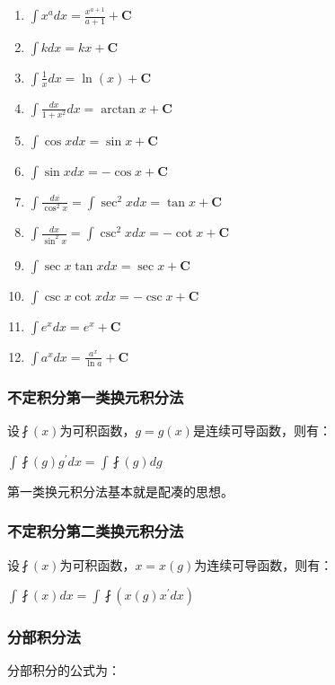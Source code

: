 \documentclass[UTF8]{ctexbook}
\newcommand{\derivative}{^\prime}
\newcommand{\defFunction}[1]{\fint(#1)}
\newcommand{\mathConstant}{\mathbf{C}}
\begin{document}
{{{{    \begin{enumerate}
      \item $\int x^adx = \frac{x^{a+1}}{a+1} + \mathConstant$
      \item $\int kdx = kx + \mathConstant$
      \item $\int \frac{1}{x}dx = \ln(x) + \mathConstant$
      \item $\int \frac{dx}{1+x^2}dx = \arctan x + \mathConstant$
      \item $\int \cos xdx = \sin x + \mathConstant$
      \item $\int \sin xdx = -\cos x + \mathConstant$
      \item $\int \frac{dx}{\cos^2x} = \int \sec^2xdx = \tan x + \mathConstant$
      \item $\int \frac{dx}{\sin^2x} = \int\csc^2xdx = -\cot x + \mathConstant$
      \item $\int \sec x\tan xdx = \sec x + \mathConstant$
      \item $\int \csc x\cot xdx = -\csc x + \mathConstant$
      \item $\int e^xdx = e^x + \mathConstant$
      \item $\int a^xdx = \frac{a^x}{\ln a} + \mathConstant$
    \end{enumerate}

  }%

  \subsubsection{不定积分第一类换元积分法}{
    设$\defFunction{x}$为可积函数，$g = g(x)$是连续可导函数，则有：

    $\int \defFunction{g}g\derivative dx = \int \defFunction{g}dg$

    第一类换元积分法基本就是配凑的思想。

  }%

  \subsubsection{不定积分第二类换元积分法}{
    设$\defFunction{x}$为可积函数，$x = x(g)$为连续可导函数，则有：

    $\int \defFunction{x}dx = \int \defFunction{x(g)x\derivative dx}$

  }%

  \subsubsection{分部积分法}{
    分部积分的公式为：

}}}}
\end{document}
